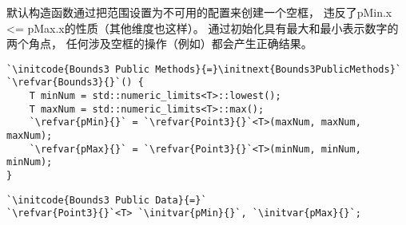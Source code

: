 默认构造函数通过把范围设置为不可用的配置来创建一个空框，
违反了{\ttfamily pMin.x <= pMax.x}的性质（其他维度也这样）。
通过初始化具有最大和最小表示数字的两个角点，
任何涉及空框的操作（例如）都会产生正确结果。
\begin{lstlisting}
`\initcode{Bounds3 Public Methods}{=}\initnext{Bounds3PublicMethods}`
`\refvar{Bounds3}{}`() {
    T minNum = std::numeric_limits<T>::lowest();
    T maxNum = std::numeric_limits<T>::max();
    `\refvar{pMin}{}` = `\refvar{Point3}{}`<T>(maxNum, maxNum, maxNum);
    `\refvar{pMax}{}` = `\refvar{Point3}{}`<T>(minNum, minNum, minNum);
}
\end{lstlisting}

\begin{lstlisting}
`\initcode{Bounds3 Public Data}{=}`
`\refvar{Point3}{}`<T> `\initvar{pMin}{}`, `\initvar{pMax}{}`;
\end{lstlisting}